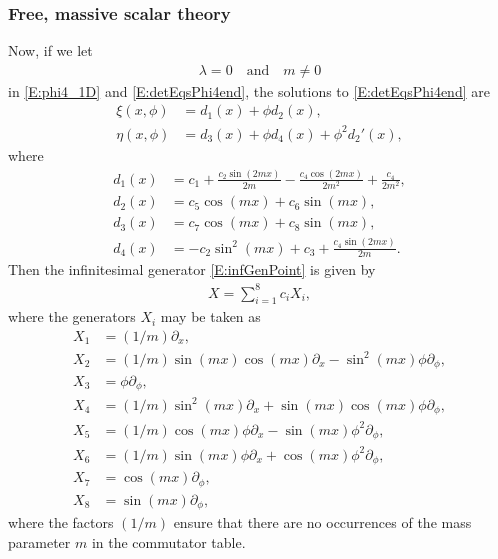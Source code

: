 \documentclass[a4paper,hidelinks, 12pt]{article}
\numberwithin{equation}{section}
\theoremstyle{plain}
\begin{document}
	\subsubsection{Free, massive scalar theory}
\label{sec:FreeMassiveScalarTheory}
Now, if we let 
\begin{align}
	\lambda=0\quad \text{and} \quad m\ne 0
\end{align}
in \eqref{E:phi4_1D} and \eqref{E:detEqsPhi4end}, 
	the solutions to \eqref{E:detEqsPhi4end} are
\begin{align}
	\xi(x,\phi) &=d_1(x)+ \phi d_2(x), \nonumber \\
	\eta(x,\phi) &=d_3(x)+ \phi d_4(x)+\phi^2 d_2'(x), 
\end{align}
where 
\begin{align}
	d_1(x)&=c_1+\frac{c_2 \sin
   (2 m x)}{2 m}-\frac{c_4 \cos (2 m x)}{2 m^2}+\frac{c_4}{2 m^2}, \nonumber \\
	d_2(x)&= c_5 \cos (m x)+ c_6 \sin (m x),				\nonumber  \\
	d_3(x)&= c_7 \cos (m x)+ c_8 \sin (m x),  \nonumber \\
	d_4(x)&= -c_2 \sin ^2(m x)+c_3 +\frac{c_4 \sin (2 m x)}{2 m}.
\end{align}
Then the infinitesimal generator \eqref{E:infGenPoint} is given by
\begin{align}
	X= \sum_{i=1}^8 c_i X_i,
\end{align}
where the generators $X_i$ may be taken as
\begin{align}\label{E:generators2MST}
	X_1 &= (1/m) \partial_x, \nonumber \\
X_2 &= {(1/m) \sin (m x) \cos (m x)  {\partial_x}}-\sin ^2(m x) \phi   { \partial_\phi }, \nonumber \\
X_3 &= \phi   { \partial_\phi }, \nonumber \\
X_4 &= (1/m) \sin ^2(m x)  { \partial_x}+\sin (m x) \cos (m
   x) \phi   { \partial_\phi }, \nonumber \\
X_5 &=(1/m)\cos (m x) \phi   { \partial_x}- \sin (m x)
   \phi ^2  { \partial_\phi }, \nonumber \\
	X_6 &=  (1/m)\sin (m x) \phi   { \partial_x}+ \cos (m x)
   \phi ^2  { \partial_\phi }, \nonumber \\
	X_7 &= \cos (m x)  { \partial_\phi }, \nonumber \\
	X_8 &=\sin (m x) \partial_\phi,
\end{align}
where the factors $(1/m)$ ensure that there are no occurrences of the mass parameter $m$ in the commutator table.
\end{document}
